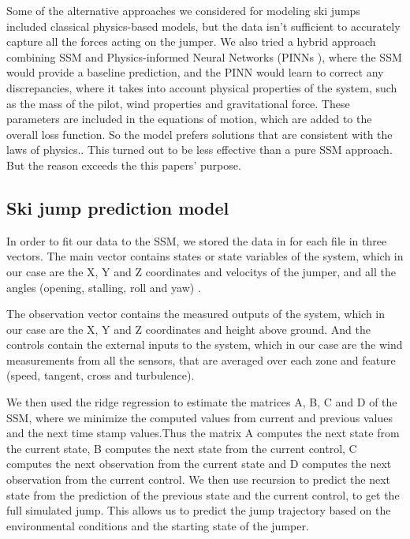 \documentclass[sigconf,natbib=false, language=english]{acmart}
\begin{document}

Some of the alternative approaches we considered for modeling ski jumps included classical
physics-based models, but the data  isn't sufficient to accurately capture all the forces acting on the jumper.
We also tried a hybrid approach combining SSM and Physics-informed Neural Networks (PINNs \cite{Cai2021_PINN_FluidMechanics}), where
the SSM would provide a baseline prediction, and the PINN would learn to correct any discrepancies, where it takes into
account physical properties of the system, such as the mass of the pilot, wind properties and gravitational force. 
These parameters are included in the equations of motion, which are added to the overall loss function. 
So the model prefers solutions that are consistent with the laws of physics.. This
turned out to be less effective than a pure SSM approach. But the reason exceeds the this papers' purpose.


\subsection{Ski jump prediction model}

In order to fit our data to the SSM, we stored the data in for each file in three vectors.
The main vector contains states or state variables of the system, which in our case are the
X, Y and Z coordinates and velocitys of the jumper, and all the angles (opening, stalling, roll and yaw) \cite{CERN_SkiJump_Physics}.

The observation vector contains the measured outputs of the system, which in our case are the X, Y and Z coordinates
and height above ground. And the controls contain the external inputs to the system, which in our case are
the wind measurements from all the sensors, that are averaged over each zone and feature (speed, tangent, cross and turbulence).

We then used the ridge regression to estimate the matrices A, B, C and D of the SSM, where we minimize the computed values from current
and previous values and the next time stamp values.Thus the matrix A computes the next state from the current state, 
B computes the next state from the current control, C computes the next observation from the current state and D computes 
the next observation from the current control. We then use recursion to predict the next state from the prediction of the 
previous state and the current control, to get the full simulated jump. This allows us to predict the jump trajectory 
based on the environmental conditions and the starting state of the jumper.
\end{document}
